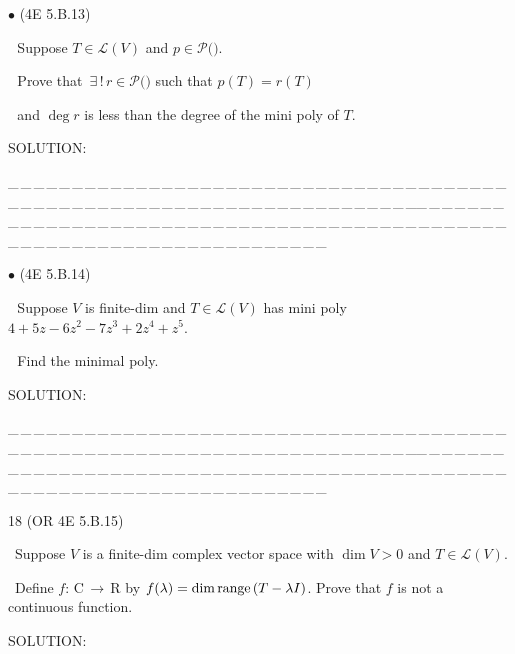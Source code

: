 \documentclass[a4paper, 11pt, UTF8]{article}
\def\range{\textup{range}\,}
\def\Lm{\mathcal{L}}
\def\Po{\mathcal{P}}
\def\Rbf{$\,{\timesbf R}\,$}
\def\Cbf{$\,{\timesbf C}\,$}
\begin{document}
\begin{large}
{\small $\bullet$} (\normalsize{4E 5.B.13})\par\,\, {\timessl\Large 
Suppose $T\in \Lm(V)$ and $p \in \Po(${\timesbf}$)$.}\par\,\,
{\timessl\Large Prove that $\,\exists\,!\,r \in \Po(${\timesbf}$)$ such that $p(T) = r(T)$}\par\,\,
{\timessl\Large and $\deg r$ is less than the degree of the mini poly of $T$.
}\par
{\timesbf S\footnotesize{OLUTION:}}\par\quad

\par
{\tiny \_\,\_\,\_\,\_\,\_\,\_\,\_\,\_\,\_\,\_\,\_\,\_\,\_\,\_\,\_\,\_\,\_\,\_\,\_\,\_\,\_\,\_\,\_\,\_\,\_\,\_\,\_\,\_\,\_\,\_\,\_\,\_\,\_\,\_\,\_\,\_\,\_\,\_\,\_\,\_\,\_\,\_\,\_\,\_\,\_\,\_\,\_\,\_\,\_\,\_\,\_\,\_\,\_\,\_\,\_\,\_\,\_\,\_\,\_\,\_\,\_\,\_\,\_\,\_\,\_\,\_\,\_\,\_\,\_\,\_\,\_\_\,\_\,\_\,\_\,\_\,\_\,\_\,\_\,\_\,\_\,\_\,\_\,\_\,\_\,\_\,\_\,\_\,\_\,\_\,\_\,\_\,\_\,\_\,\_\,\_\,\_\,\_\,\_\,\_\,\_\,\_\,\_\,\_\,\_\,\_\,\_\,\_\,\_\,\_\,\_\,\_\,\_\,\_\,\_\,\_\,\_\,\_\,\_\,\_\,\_\,\_\,\_\,\_\,\_\,\_\,\_\,\_\,\_\,\_\,\_\,\_\,\_\,\_\,\_\,\_\,\_\,\_\,\_\,\_\,\_\,\_}\par

{\small $\bullet$} (\normalsize{4E 5.B.14})\par\,\, {\timessl\Large 
Suppose $V$ is finite-dim and $T\in \Lm(V)$ has mini poly
$4 + 5z - 6z^2 - 7z^3 + 2z^4 + z^5$.}\par\,\,
{\timessl\Large Find the minimal poly.}\par
{\timesbf S\footnotesize{OLUTION:}}\par\quad

\par
{\tiny \_\,\_\,\_\,\_\,\_\,\_\,\_\,\_\,\_\,\_\,\_\,\_\,\_\,\_\,\_\,\_\,\_\,\_\,\_\,\_\,\_\,\_\,\_\,\_\,\_\,\_\,\_\,\_\,\_\,\_\,\_\,\_\,\_\,\_\,\_\,\_\,\_\,\_\,\_\,\_\,\_\,\_\,\_\,\_\,\_\,\_\,\_\,\_\,\_\,\_\,\_\,\_\,\_\,\_\,\_\,\_\,\_\,\_\,\_\,\_\,\_\,\_\,\_\,\_\,\_\,\_\,\_\,\_\,\_\,\_\,\_\_\,\_\,\_\,\_\,\_\,\_\,\_\,\_\,\_\,\_\,\_\,\_\,\_\,\_\,\_\,\_\,\_\,\_\,\_\,\_\,\_\,\_\,\_\,\_\,\_\,\_\,\_\,\_\,\_\,\_\,\_\,\_\,\_\,\_\,\_\,\_\,\_\,\_\,\_\,\_\,\_\,\_\,\_\,\_\,\_\,\_\,\_\,\_\,\_\,\_\,\_\,\_\,\_\,\_\,\_\,\_\,\_\,\_\,\_\,\_\,\_\,\_\,\_\,\_\,\_\,\_\,\_\,\_\,\_\,\_\,\_}\par

{\timesbf\Large 18} (\normalsize{O{\small R} 4E 5.B.15})\par\quad\, {\timessl\Large 
Suppose $V$ is a finite-dim complex vector space with $\dim V > 0$ and $T\in\Lm(V)$.}\par\quad\,
{\timessl\Large Define $f:\Cbf\rightarrow\Rbf\,$by $f(\lambda) = \dim \range(T-\lambda I)$.
Prove that $f$ is not a continuous function.
}\par
{\timesbf S\footnotesize{OLUTION:}}\par\quad


\end{large}
\end{document}
